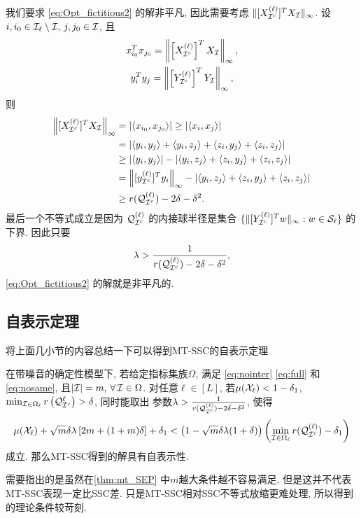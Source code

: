 我们要求 \eqref{eq:Opt_fictitious2} 的解非平凡, 因此需要考虑
\(\|[X_{\mathcal{I}^c}^{(\ell)}]^T X_{\mathcal{I}} \|_{\infty} \).
设\(i, i_0\in \mathcal{I}_\ell \setminus \mathcal{I}, \, j, j_0\in
\mathcal{I}\), 且
\begin{gather*}
x_{i_0}^T x_{j_0}=\left\|\left[X_{\mathcal{I}^c}^{(\ell)}\right]^T X_{\mathcal{I}}\right\|_\infty, \\
y_i^T y_j=\left\|\left[ Y_{\mathcal{I}^c}^{(\ell)}\right]^T Y_{\mathcal{I}}\right\|_\infty ,
\end{gather*}
则
\begin{align}
  \left\|[X_{\mathcal{I}^c}^{(\ell)}]^TX_{\mathcal{I}}\right\|_{\infty}&=\left|\langle x_{i_0},
  x_{j_0}\rangle\right|  \geq \left|\langle x_i, x_j\rangle\right|\nonumber\\
  &= \left|\langle y_i, y_j\rangle  + \langle y_i, z_j\rangle + \langle z_i, y_j\rangle + \langle z_i, z_j\rangle\right|\nonumber\\
  &\geq \left|\langle y_i, y_j\rangle\right| - \left|\langle y_i, z_j\rangle + \langle z_i, y_j\rangle + \langle z_i, z_j\rangle\right|\nonumber\\
  & = \left\|[y_{\mathcal{I}^c}^{(\ell)}]^Ty_i\right\|_{\infty} - \left|\langle y_i, z_j\rangle + \langle z_i, y_j\rangle + \langle z_i, z_j\rangle\right|\nonumber\\
  &\geq r(\mathcal{Q}^{(\ell)}_{\mathcal{I}^c}) - 2\delta - \delta^2. \label{eq:lowerbounding_maX_affinity}
\end{align}
最后一个不等式成立是因为 \(\mathcal{Q}^{(\ell)}_{\mathcal{I}^c}\) 
的内接球半径是集合 \(\{\| [ Y_{\mathcal{I}^c}^{(\ell)}]^T w\|_\infty: w
\in  \mathcal{S}_{\ell}\} \) 的下界. 因此只要
\begin{equation}\label{eq:lambda_low}
  \lambda > \frac{1}{ r(\mathcal{Q}^{(\ell)}_{\mathcal{I}^c}) - 2\delta - \delta^2},
\end{equation}
 \eqref{eq:Opt_fictitious2} 的解就是非平凡的.

\subsection{自表示定理}
将上面几小节的内容总结一下可以得到MT-SSC的自表示定理
\begin{theorem}\label{thm:mt_SEP}
  在带噪音的确定性模型下, 若给定指标集族\(\Omega\), 满足 \eqref{eq:nointer} 
 \eqref{eq:full} 和 \eqref{eq:nosame},  且\(|\mathcal{I}|=m, \, \forall\, \mathcal{I} \in \Omega\). 对任意\(\ell \in [L]\),
  若\(\mu(\mathcal{X}_\ell)<1-\delta_1\), \(\min_{\mathcal{I}\in
  \Omega_\ell} r\left(\mathcal{Q}^\ell_{\mathcal{I}^c}\right) > \delta\), 同时能取出
  参数\(\lambda > \frac{1}{ r(\mathcal{Q}^{(\ell)}_{\mathcal{I}^c}) - 2\delta -\delta^2}\),
  使得
  \[\mu(\mathcal{X}_\ell) +\sqrt{m}\delta\lambda \left[2m+(1+m)\delta \right] +\delta_1
  < \left(1-\sqrt{m}\delta\lambda(1+\delta)\right)\left(\min_{\mathcal{I}\in \Omega_\ell}
  r(\mathcal{Q}^{(\ell)}_{\mathcal{I}^c})-\delta_1\right)\]
  成立. 那么MT-SSC得到的解具有自表示性.
\end{theorem}
需要指出的是虽然在\autoref{thm:mt_SEP} 中\(m\)越大条件越不容易满足,
但是这并不代表MT-SSC表现一定比SSC差. 只是MT-SSC相对SSC不等式放缩更难处理,
所以得到的理论条件较苛刻.
